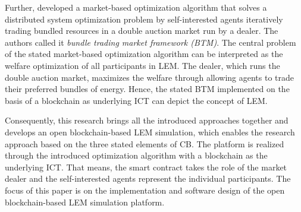 Further,  developed a market-based optimization algorithm
that solves a distributed system optimization problem by self-interested agents iteratively 
trading bundled resources in a double auction market run by a dealer. The authors called it 
\textit{bundle trading market framework (BTM)}. The central problem of the stated market-based 
optimization algorithm can be interpreted as the welfare optimization of all participants in LEM. 
The dealer, which runs the double auction market, maximizes the welfare through allowing agents 
to trade their preferred bundles of energy. Hence, the stated BTM implemented on the basis of a 
blockchain as underlying ICT can depict the concept of LEM.

Consequently, this research brings all the introduced approaches together 
and develops an open blockchain-based LEM simulation, which enables the research 
approach based on the three stated elements of CB. The platform is realized through 
the introduced optimization algorithm with a blockchain as the underlying ICT. 
That means, the smart contract takes the role of the market dealer and the self-interested 
agents represent the individual participants. The focus of this paper is on the 
implementation and software design of the open blockchain-based LEM simulation platform.

\clearpage